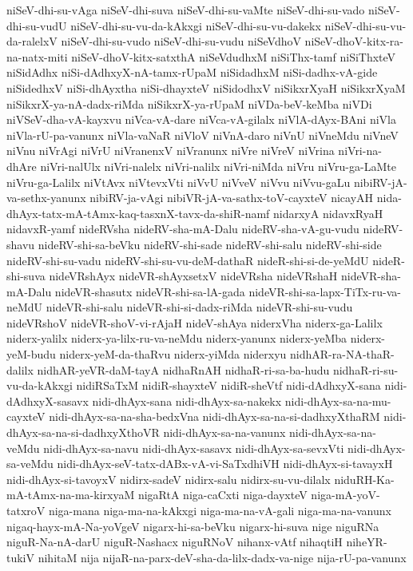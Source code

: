 {niSeV-dhi-su-vAga
niSeV-dhi-suva
niSeV-dhi-su-vaMte
niSeV-dhi-su-vado
niSeV-dhi-su-vudU
niSeV-dhi-su-vu-da-kAkxgi
niSeV-dhi-su-vu-dakekx
niSeV-dhi-su-vu-da-ralelxV
niSeV-dhi-su-vudo
niSeV-dhi-su-vudu
niSeVdhoV
niSeV-dhoV-kitx-ra-na-natx-miti
niSeV-dhoV-kitx-satxthA
niSeVdudhxM
niSiThx-tamf
niSiThxteV
niSidAdhx
niSi-dAdhxyX-nA-tamx-rUpaM
niSidadhxM
niSi-dadhx-vA-gide
niSidedhxV
niSi-dhAyxtha
niSi-dhayxteV
niSidodhxV
niSikxrXyaH
niSikxrXyaM
niSikxrX-ya-nA-dadx-riMda
niSikxrX-ya-rUpaM
niVDa-beV-keMba
niVDi
niVSeV-dha-vA-kayxvu
niVca-vA-dare
niVca-vA-gilalx
niVlA-dAyx-BAni
niVla
niVla-rU-pa-vanunx
niVla-vaNaR
niVloV
niVnA-daro
niVnU
niVneMdu
niVneV
niVnu
niVrAgi
niVrU
niVranenxV
niVranunx
niVre
niVreV
niVrina
niVri-na-dhAre
niVri-nalUlx
niVri-nalelx
niVri-nalilx
niVri-niMda
niVru
niVru-ga-LaMte
niVru-ga-Lalilx
niVtAvx
niVtevxVti
niVvU
niVveV
niVvu
niVvu-gaLu
nibiRV-jA-va-sethx-yanunx
nibiRV-ja-vAgi
nibiVR-jA-va-sathx-toV-cayxteV
nicayAH
nida-dhAyx-tatx-mA-tAmx-kaq-tasxnX-tavx-da-shiR-namf
nidarxyA
nidavxRyaH
nidavxR-yamf
nideRVsha
nideRV-sha-mA-Dalu
nideRV-sha-vA-gu-vudu
nideRV-shavu
nideRV-shi-sa-beVku
nideRV-shi-sade
nideRV-shi-salu
nideRV-shi-side
nideRV-shi-su-vadu
nideRV-shi-su-vu-deM-dathaR
nideR-shi-si-de-yeMdU
nideR-shi-suva
nideVRshAyx
nideVR-shAyxsetxV
nideVRsha
nideVRshaH
nideVR-sha-mA-Dalu
nideVR-shasutx
nideVR-shi-sa-lA-gada
nideVR-shi-sa-lapx-TiTx-ru-va-neMdU
nideVR-shi-salu
nideVR-shi-si-dadx-riMda
nideVR-shi-su-vudu
nideVRshoV
nideVR-shoV-vi-rAjaH
nideV-shAya
niderxVha
niderx-ga-Lalilx
niderx-yalilx
niderx-ya-lilx-ru-va-neMdu
niderx-yanunx
niderx-yeMba
niderx-yeM-budu
niderx-yeM-da-thaRvu
niderx-yiMda
niderxyu
nidhAR-ra-NA-thaR-dalilx
nidhAR-yeVR-daM-tayA
nidhaRnAH
nidhaR-ri-sa-ba-hudu
nidhaR-ri-su-vu-da-kAkxgi
nidiRSaTxM
nidiR-shayxteV
nidiR-sheVtf
nidi-dAdhxyX-sana
nidi-dAdhxyX-sasavx
nidi-dhAyx-sana
nidi-dhAyx-sa-nakekx
nidi-dhAyx-sa-na-mu-cayxteV
nidi-dhAyx-sa-na-sha-bedxVna
nidi-dhAyx-sa-na-si-dadhxyXthaRM
nidi-dhAyx-sa-na-si-dadhxyXthoVR
nidi-dhAyx-sa-na-vanunx
nidi-dhAyx-sa-na-veMdu
nidi-dhAyx-sa-navu
nidi-dhAyx-sasavx
nidi-dhAyx-sa-sevxVti
nidi-dhAyx-sa-veMdu
nidi-dhAyx-seV-tatx-dABx-vA-vi-SaTxdhiVH
nidi-dhAyx-si-tavayxH
nidi-dhAyx-si-tavoyxV
nidirx-sadeV
nidirx-salu
nidirx-su-vu-dilalx
niduRH-Ka-mA-tAmx-na-ma-kirxyaM
nigaRtA
niga-caCxti
niga-dayxteV
niga-mA-yoV-tatxroV
niga-mana
niga-ma-na-kAkxgi
niga-ma-na-vA-gali
niga-ma-na-vanunx
nigaq-hayx-mA-Na-yoVgeV
nigarx-hi-sa-beVku
nigarx-hi-suva
nige
niguRNa
niguR-Na-nA-darU
niguR-Nashacx
niguRNoV
nihanx-vAtf
nihaqtiH
niheYR-tukiV
nihitaM
nija
nijaR-na-parx-deV-sha-da-lilx-dadx-va-nige
nija-rU-pa-vanunx
}
